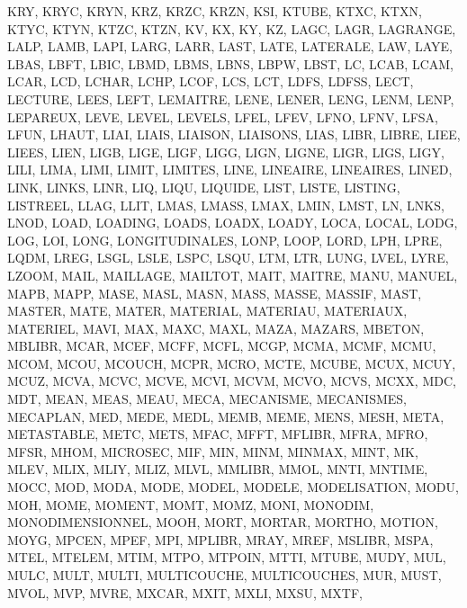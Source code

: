 {{{		KRY,
		KRYC,
		KRYN,
		KRZ,
		KRZC,
		KRZN,
		KSI,
		KTUBE,
		KTXC,
		KTXN,
		KTYC,
		KTYN,
		KTZC,
		KTZN,
		KV,
		KX,
		KY,
		KZ,
		LAGC,
		LAGR,
		LAGRANGE,
		LALP,
		LAMB,
		LAPI,
		LARG,
		LARR,
		LAST,
		LATE,
		LATERALE,
		LAW,
		LAYE,
		LBAS,
		LBFT,
		LBIC,
		LBMD,
		LBMS,
		LBNS,
		LBPW,
		LBST,
		LC,
		LCAB,
		LCAM,
		LCAR,
		LCD,
		LCHAR,
		LCHP,
		LCOF,
		LCS,
		LCT,
		LDFS,
		LDFSS,
		LECT,
		LECTURE,
		LEES,
		LEFT,
		LEMAITRE,
		LENE,
		LENER,
		LENG,
		LENM,
		LENP,
		LEPAREUX,
		LEVE,
		LEVEL,
		LEVELS,
		LFEL,
		LFEV,
		LFNO,
		LFNV,
		LFSA,
		LFUN,
		LHAUT,
		LIAI,
		LIAIS,
		LIAISON,
		LIAISONS,
		LIAS,
		LIBR,
		LIBRE,
		LIEE,
		LIEES,
		LIEN,
		LIGB,
		LIGE,
		LIGF,
		LIGG,
		LIGN,
		LIGNE,
		LIGR,
		LIGS,
		LIGY,
		LILI,
		LIMA,
		LIMI,
		LIMIT,
		LIMITES,
		LINE,
		LINEAIRE,
		LINEAIRES,
		LINED,
		LINK,
		LINKS,
		LINR,
		LIQ,
		LIQU,
		LIQUIDE,
		LIST,
		LISTE,
		LISTING,
		LISTREEL,
		LLAG,
		LLIT,
		LMAS,
		LMASS,
		LMAX,
		LMIN,
		LMST,
		LN,
		LNKS,
		LNOD,
		LOAD,
		LOADING,
		LOADS,
		LOADX,
		LOADY,
		LOCA,
		LOCAL,
		LODG,
		LOG,
		LOI,
		LONG,
		LONGITUDINALES,
		LONP,
		LOOP,
		LORD,
		LPH,
		LPRE,
		LQDM,
		LREG,
		LSGL,
		LSLE,
		LSPC,
		LSQU,
		LTM,
		LTR,
		LUNG,
		LVEL,
		LYRE,
		LZOOM,
		MAIL,
		MAILLAGE,
		MAILTOT,
		MAIT,
		MAITRE,
		MANU,
		MANUEL,
		MAPB,
		MAPP,
		MASE,
		MASL,
		MASN,
		MASS,
		MASSE,
		MASSIF,
		MAST,
		MASTER,
		MATE,
		MATER,
		MATERIAL,
		MATERIAU,
		MATERIAUX,
		MATERIEL,
		MAVI,
		MAX,
		MAXC,
		MAXL,
		MAZA,
		MAZARS,
		MBETON,
		MBLIBR,
		MCAR,
		MCEF,
		MCFF,
		MCFL,
		MCGP,
		MCMA,
		MCMF,
		MCMU,
		MCOM,
		MCOU,
		MCOUCH,
		MCPR,
		MCRO,
		MCTE,
		MCUBE,
		MCUX,
		MCUY,
		MCUZ,
		MCVA,
		MCVC,
		MCVE,
		MCVI,
		MCVM,
		MCVO,
		MCVS,
		MCXX,
		MDC,
		MDT,
		MEAN,
		MEAS,
		MEAU,
		MECA,
		MECANISME,
		MECANISMES,
		MECAPLAN,
		MED,
		MEDE,
		MEDL,
		MEMB,
		MEME,
		MENS,
		MESH,
		META,
		METASTABLE,
		METC,
		METS,
		MFAC,
		MFFT,
		MFLIBR,
		MFRA,
		MFRO,
		MFSR,
		MHOM,
		MICROSEC,
		MIF,
		MIN,
		MINM,
		MINMAX,
		MINT,
		MK,
		MLEV,
		MLIX,
		MLIY,
		MLIZ,
		MLVL,
		MMLIBR,
		MMOL,
		MNTI,
		MNTIME,
		MOCC,
		MOD,
		MODA,
		MODE,
		MODEL,
		MODELE,
		MODELISATION,
		MODU,
		MOH,
		MOME,
		MOMENT,
		MOMT,
		MOMZ,
		MONI,
		MONODIM,
		MONODIMENSIONNEL,
		MOOH,
		MORT,
		MORTAR,
		MORTHO,
		MOTION,
		MOYG,
		MPCEN,
		MPEF,
		MPI,
		MPLIBR,
		MRAY,
		MREF,
		MSLIBR,
		MSPA,
		MTEL,
		MTELEM,
		MTIM,
		MTPO,
		MTPOIN,
		MTTI,
		MTUBE,
		MUDY,
		MUL,
		MULC,
		MULT,
		MULTI,
		MULTICOUCHE,
		MULTICOUCHES,
		MUR,
		MUST,
		MVOL,
		MVP,
		MVRE,
		MXCAR,
		MXIT,
		MXLI,
		MXSU,
		MXTF,
}}}
